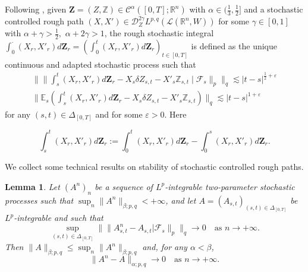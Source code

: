 \documentclass[11pt,a4paper]{article}
\newcommand{\R}{\mathbb{R}}
\newcommand{\E}{\mathbb{E}}
\theoremstyle{plain}
\newtheorem{lemma}[defn]{Lemma}
\begin{document}
{
Following \cite{FHL21}, given $\mathbf{Z}=(Z,\mathbb{Z}) \in \mathscr{C}^\alpha([0,T];\R^n)$ with $\alpha \in (\frac13,\frac12]$ and a stochastic controlled rough path $(X,X') \in \mathscr{D}_Z^{2\gamma}L^{p,q}(\mathscr{L}(\R^n,W))$ for some $\gamma \in [0,1]$ with $\alpha + \gamma > \frac12,$ $\alpha + 2\gamma > 1$, the rough stochastic integral $\int_0^\cdot (X_r,X'_r) d\mathbf{Z}_r = (\int_0^t (X_r,X'_r) d\mathbf{Z}_r )_{t \in [0,T]}$ is defined as the unique continuous and adapted stochastic process such that \begin{equation} \label{eq:roughstochasticintegral}
    \begin{aligned}
    \|\| \int_s^t (X_r,X'_r) d\mathbf{Z}_r - X_s \delta Z_{s,t} - X'_s \mathbb{Z}_{s,t} \mid \mathcal{F}_s \|_p \|_q \lesssim |t-s|^{\frac12 + \varepsilon} \\
    \|\E_s( \int_s^t (X_r,X'_r) d\mathbf{Z}_r - X_s \delta Z_{s,t} - X'_s \mathbb{Z}_{s,t} ) \|_q \lesssim |t-s|^{1 + \varepsilon}
\end{aligned}
\end{equation} 
for any $(s,t) \in \Delta_{[0,T]}$ and for some $\varepsilon >0$. Here

$$\int_s^t (X_r,X'_r) d\mathbf{Z}_r  := \int_0^t (X_r,X'_r) d\mathbf{Z}_r  - \int_0^s (X_r,X'_r) d\mathbf{Z}_r. $$ 
}
We collect some technical results on stability of stochastic controlled rough paths. 
\begin{lemma} \label{lemma:technicalconvergence}
   Let $(A^n)_n$ be a sequence of $L^p$-integrable two-parameter stochastic processes such that $\sup_n \|A^n\|_{\beta ; p, q} < + \infty$, and let $A = (A_{s, t})_{(s, t) \in\Delta_{[0, T]}}$ be $L^p$-integrable and such that \begin{equation*}
      \sup_{(s, t) \in \Delta_{[0, T]}} \|\|A^n_{s, t} - A_{s, t} |
     \mathcal{F}_s \|_p \|_q \to 0 \quad \text{as $n
     \to + \infty$} .
  \end{equation*}
  Then $\|A\|_{\beta ; p, q} \le \sup_n \|A^n \|_{\beta ; p, q}$ and, for any $\alpha < \beta$, \begin{equation*}
      \|A^n - A\|_{\alpha ; p, q} \to 0 \quad \text{as $n
  \to + \infty$.}
  \end{equation*}  
\end{lemma}
\end{document}
